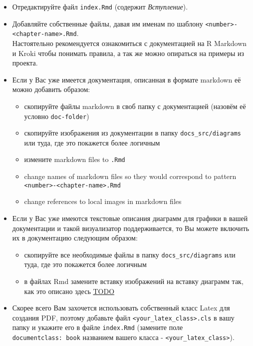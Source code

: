 \documentclass[12pt,a4paper,12pt,oneside,openany]{book}
\providecommand{\tightlist}{%
  \setlength{\itemsep}{0pt}\setlength{\parskip}{0pt}}
\begin{document}
\begin{itemize}
\item
  Отредактируйте файл \texttt{index.Rmd} (содержит \emph{Вступление}).
\item
  Добавляйте собственные файлы, давая им именам по шаблону \texttt{\textless{}number\textgreater{}-\textless{}chapter-name\textgreater{}.Rmd}.\\
  Настоятельно рекомендуется ознакомиться с документацией на R Markdown и Kroki чтобы понимать правила, а так же можно опираться на примеры из проекта.
\item
  Если у Вас уже имеется документация, описанная в формате markdown её можно добавить образом:

  \begin{itemize}
  \tightlist
  \item
    скопируйте файлы markdown в своб папку с документацией (назовём её условно \texttt{doc-folder})
  \item
    скопируйте изображения из документации в папку \texttt{docs\_src/diagrams} или туда, где это покажется более логичным
  \item
    измените markdown files to \texttt{.Rmd}
  \item
    change names of markdown files so they would correspond to pattern \texttt{\textless{}number\textgreater{}-\textless{}chapter-name\textgreater{}.Rmd}
  \item
    change references to local images in markdown files
  \end{itemize}
\item
  Если у Вас уже имеются текстовые описания диаграмм для графики в вашей документации и такой визуализатор поддерживается, то Вы можете включить их в документацию следующим образом:

  \begin{itemize}
  \tightlist
  \item
    скопируйте все необходимые файлы в папку \texttt{docs\_src/diagrams} или туда, где это покажется более логичным
  \item
    в файлах Rmd замените вставку изображений на вставку диаграмм так, как это описано здесь \url{TODO}
  \end{itemize}
\item
  Скорее всего Вам захочется использовать собственный класс Latex для создания PDF, поэтому добавьте файл \texttt{\textless{}your\_latex\_class\textgreater{}.cls} в вашу папку и укажите его в файле \texttt{index.Rmd} (замените поле \texttt{documentclass:\ book} названием вашего класса - \texttt{\textless{}your\_latex\_class\textgreater{}}).
\end{itemize}
\end{document}
